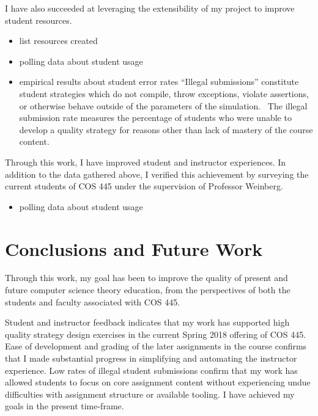 \documentclass[pageno]{jpaper}
\begin{document}
I have also succeeded at leveraging the extensibility of my project to improve student resources.

\begin{itemize}
\item list resources created
\item polling data about student usage
\item empirical results about student error rates
  ``Illegal submissions'' constitute student strategies which do not compile, throw exceptions, violate assertions, or otherwise behave outside of the parameters of the simulation.~\cite{Poorly performing strategies which obey the specification are legal.}
  The illegal submission rate measures the percentage of students who were unable to develop a quality strategy for reasons other than lack of mastery of the course content.
\end{itemize}

Through this work, I have improved student and instructor experiences.
In addition to the data gathered above, I verified this achievement by surveying the current students of COS 445 under the supervision of Professor Weinberg.
\begin{itemize}
\item polling data about student usage
\end{itemize}



\section*{Conclusions and Future Work}
Through this work, my goal has been to improve the quality of present and future computer science theory education, from the perspectives of both the students and faculty associated with COS 445.

Student and instructor feedback indicates that my work has supported high quality strategy design exercises in the current Spring 2018 offering of COS 445.
Ease of development and grading of the later assignments in the course confirms that I made substantial progress in simplifying and automating the instructor experience.
Low rates of illegal student submissions confirm that my work has allowed students to focus on core assignment content without experiencing undue difficulties with assignment structure or available tooling.
I have achieved my goals in the present time-frame.
\end{document}
